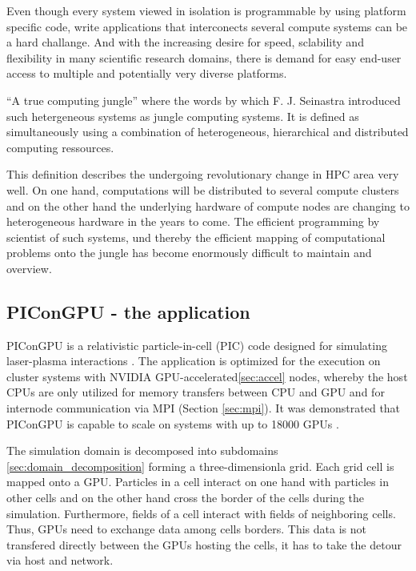 Even though every system viewed in isolation is programmable by using
platform specific code, write applications that interconects several
compute systems can be a hard challange. And with the increasing
desire for speed, sclability and flexibility in many scientific
research domains, there is demand for easy end-user access to multiple
and potentially very diverse platforms.

``A true computing jungle'' where the words by which F. J. Seinastra
introduced such hetergeneous systems as jungle computing
systems\cite{ref:jungle}. It is defined as simultaneously using a
combination of heterogeneous, hierarchical and distributed computing
ressources.

This definition describes the undergoing revolutionary change in HPC
area very well. On one hand, computations will be distributed to
several compute clusters and on the other hand the underlying hardware
of compute nodes are changing to heterogeneous hardware in the years
to come. The efficient programming by scientist of such systems, und
thereby the efficient mapping of computational problems onto the
jungle has become enormously difficult to maintain and overview.


\subsection{PIConGPU - the application}
\label{sec:picongpu}

PIConGPU is a relativistic particle-in-cell (PIC) code designed for
simulating laser-plasma interactions \cite{ref:picongpu}. The
application is optimized for the execution on cluster systems with
NVIDIA GPU-accelerated\ref{sec:accel} nodes, whereby the host CPUs are
only utilized for memory transfers between CPU and GPU and for
internode communication via MPI (Section \ref{sec:mpi}). It was 
demonstrated that PIConGPU is capable to scale on systems with
up to 18000 GPUs \cite{ref:picongpu_scale}.

The simulation domain is decomposed into subdomains
\ref{sec:domain_decomposition} forming a three-dimensionla grid. Each
grid cell is mapped onto a GPU. Particles in a cell interact on one
hand with particles in other cells and on the other hand cross the
border of the cells during the simulation. Furthermore, fields of a
cell interact with fields of neighboring cells. Thus, GPUs need to
exchange data among cells borders. This data is not transfered
directly between the GPUs hosting the cells, it has to take the detour
via host and network.

